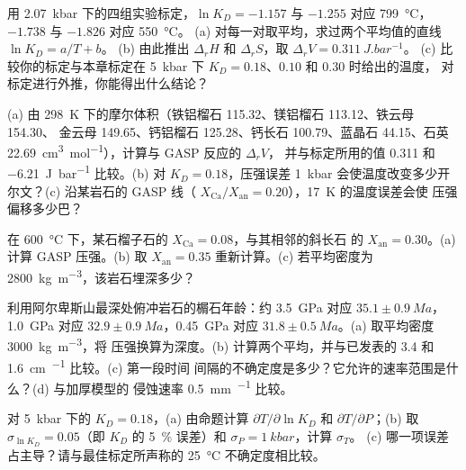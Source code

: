 \begin{exercise}[$\star\star$]\label{exo:b2:pt-paths:5}
用 \qty{2.07}{kbar} 下的四组实验标定，$\ln K_D =
-1.157$ 与 $-1.255$ 对应 \qty{799}{\celsius}，$-1.738$ 与 $-1.826$ 对应 \qty{550}{\celsius}。
(a) 对每一对取平均，求过两个平均值的直线 $\ln K_D = a/T + b$。
(b) 由此推出 $\Delta_r H$ 和 $\Delta_r S$，取 $\Delta_r V = \qty{0.311}{J.bar^{-1}}$。
(c) 比较你的标定与本章标定在
\qty{5}{kbar} 下 $K_D = 0.18$、$0.10$ 和 $0.30$ 时给出的温度，
对标定进行外推，你能得出什么结论？
\end{exercise}

\begin{exercise}[$\star\star$]\label{exo:b2:pt-paths:6}
(a) 由 \qty{298}{K} 下的摩尔体积（铁铝榴石 115.32、镁铝榴石 113.12、铁云母 154.30、
金云母 149.65、钙铝榴石 125.28、钙长石 100.79、蓝晶石 44.15、石英
\qty{22.69}{cm^3.mol^{-1}}），计算与 GASP 反应的 $\Delta_r V$，
并与标定所用的值 \num{0.311} 和
\qty{-6.21}{J.bar^{-1}} 比较。(b) 对 $K_D = 0.18$，压强误差
\qty{1}{kbar} 会使温度改变多少开尔文？(c) 沿某岩石的 GASP 线（
$X_{\text{Ca}}/X_{\text{an}} = 0.20$），\qty{17}{K} 的温度误差会使
压强偏移多少巴？
\end{exercise}

\begin{exercise}[$\star\star$]\label{exo:b2:pt-paths:7}
在 \qty{600}{\celsius} 下，某石榴子石的 $X_{\text{Ca}} = 0.08$，与其相邻的斜长石
的 $X_{\text{an}} = 0.30$。(a) 计算 GASP 压强。(b) 取 $X_{\text{an}} =
0.35$ 重新计算。(c) 若平均密度为 \qty{2800}{kg.m^{-3}}，该岩石埋深多少？
\end{exercise}

\begin{exercise}[$\star\star$]\label{exo:b2:pt-paths:8}
利用阿尔卑斯山最深处俯冲岩石的榍石年龄：约 \qty{3.5}{GPa} 对应
$35.1 \pm \qty{0.9}{Ma}$，\qty{1.0}{GPa} 对应 $32.9 \pm \qty{0.9}{Ma}$，\qty{0.45}{GPa} 对应
$31.8 \pm \qty{0.5}{Ma}$。(a) 取平均密度 \qty{3000}{kg.m^{-3}}，将
压强换算为深度。(b) 计算两个平均，并与已发表的 3.4 和
\qty{1.6}{cm.^{-1}} 比较。(c) 第一段时间
间隔的不确定度是多少？它允许的速率范围是什么？(d) 与加厚模型的
侵蚀速率 \qty{0.5}{mm.^{-1}} 比较。
\end{exercise}

\begin{exercise}[$\star\star$]\label{exo:b2:pt-paths:9}
对 \qty{5}{kbar} 下的 $K_D = 0.18$，(a) 由命题计算 $\partial T/\partial\ln K_D$ 和
$\partial T/\partial P$；(b) 取 $\sigma_{\ln K_D} = 0.05$（即 $K_D$ 的
\qty{5}{\percent} 误差）和 $\sigma_P = \qty{1}{kbar}$，计算 $\sigma_T$。
(c) 哪一项误差占主导？请与最佳标定所声称的
\qty{25}{\celsius} 不确定度相比较。
\end{exercise}

